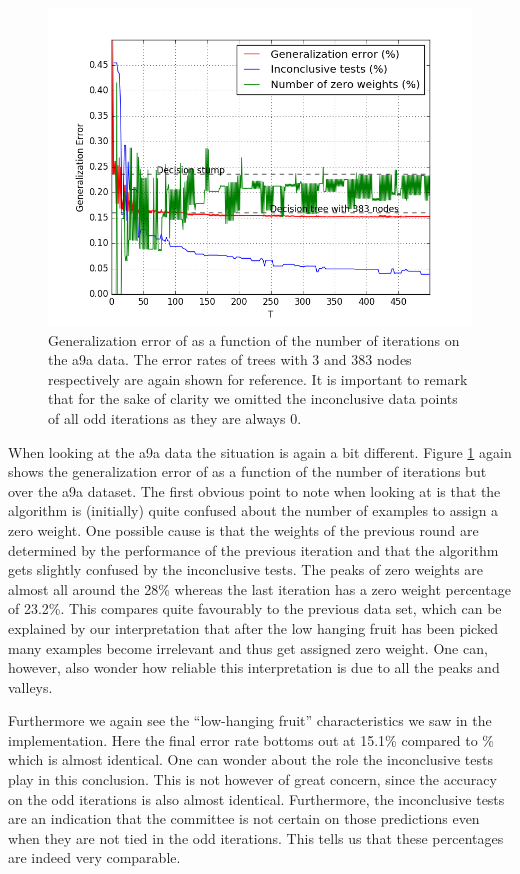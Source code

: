 \begin{figure}[!ht]
  \centering
      \includegraphics[width=\graphWidth]{generated/NHSVM.png}
  \caption{Generalization error of \NHB as a function of the number of iterations on the a9a data. The error rates of trees with 3 and 383 nodes respectively are again shown for reference. It is important to remark that for the sake of clarity we omitted the inconclusive data points of all odd iterations as they are always 0.}
      \label{fig:NHBSVM}
\end{figure}

\par When looking at the a9a data the situation is again a bit different. Figure \ref{fig:NHBSVM} again shows the generalization error of \NHB as a function of the number of iterations but over the a9a dataset. The first obvious point to note when looking at  is that the algorithm is (initially) quite confused about the number of examples to assign a zero weight. One possible cause is that the weights of the previous round are determined by the performance of the previous iteration and that the algorithm gets slightly confused by the inconclusive tests. The peaks of zero weights are almost all around the 28\% whereas the last iteration has a zero weight percentage of 23.2\%. This compares quite favourably to the previous data set, which can be explained by our interpretation that after the low hanging fruit has been picked many examples become irrelevant and thus get assigned zero weight. One can, however, also wonder how reliable this interpretation is due to all the peaks and valleys. 
\par Furthermore we again see the ``low-hanging fruit'' characteristics we saw in the \adaB implementation. Here the final error rate bottoms out at 15.1\% compared to \% which is almost identical. One can wonder about the role the inconclusive tests play in this conclusion. This is not however of great concern, since the accuracy on the odd iterations is also almost identical. Furthermore, the inconclusive tests are an indication that the committee is not certain on those predictions even when they are not tied in the odd iterations. This tells us that these percentages are indeed very comparable.  
\FloatBarrier
